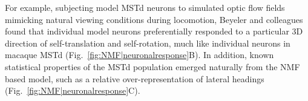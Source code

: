 
%



For example, subjecting model \ac{MSTd} neurons to simulated optic flow fields
mimicking natural viewing conditions during locomotion,
Beyeler and colleagues \citep{Beyeler2016} found that
individual model neurons
preferentially responded to a particular 3D direction of self-translation
and self-rotation,
much like individual neurons in macaque \ac{MSTd}
(Fig.~\ref{fig:NMF|neuronalresponse}B).
In addition, known statistical properties of the \ac{MSTd} population 
emerged naturally from the \ac{NMF} based model,
such as a relative over-representation of lateral headings (Fig.~\ref{fig:NMF|neuronalresponse}C).

